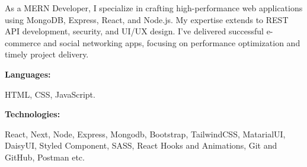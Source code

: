 \documentclass[9pt]{developercv} %
\begin{document}
\begin{minipage}[t]{0.46\textwidth}
	\vspace{-6pt}
 
	As a MERN Developer, I specialize in crafting high-performance web applications using MongoDB, Express, React, and Node.js. My expertise extends to REST API development, security, and UI/UX design. I've delivered successful e-commerce and social networking apps, focusing on performance optimization and timely project delivery. \\
\end{minipage}
\hfill %
\begin{minipage}[t]{0.465\textwidth}
    \vspace{-6pt}

    \begin{minipage}[t]{0.2\textwidth}
        \textbf{Languages:}
    \end{minipage}
    \hfill
    \begin{minipage}[t]{0.73\textwidth}
      {HTML, CSS, JavaScript. }
    \end{minipage}
    \vspace{4mm}
    
    \begin{minipage}[t]{0.2\textwidth}
        \textbf{Technologies:}
    \end{minipage}
    \hfill
    \begin{minipage}[t]{0.73\textwidth}
      React, Next, Node, Express, Mongodb, Bootstrap, TailwindCSS, MatarialUI, DaisyUI, Styled Component, SASS, React Hooks and Animations, Git and GitHub, Postman etc.
    \end{minipage}
    
\end{minipage}
\end{document}

